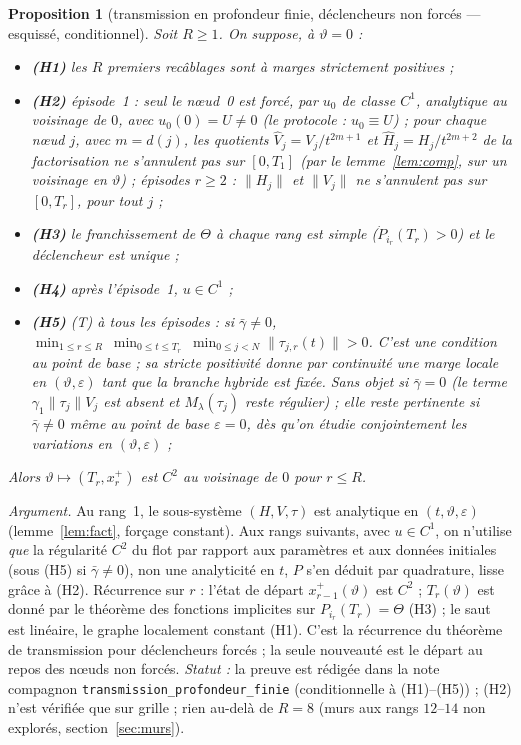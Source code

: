 \documentclass[11pt,a4paper]{article}
\newtheorem{proposition}{Proposition}
\theoremstyle{remark}
\newcommand{\vth}{\vartheta}
\begin{document}
\begin{proposition}[transmission en profondeur finie, d\'eclencheurs non forc\'es --- esquiss\'e, conditionnel]\label{prop:fini}
Soit $R\ge1$. On suppose, \`a $\vth=0$ :
\begin{itemize}[leftmargin=1.6em,itemsep=1pt]
\item \textbf{(H1)} les $R$ premiers recâblages sont \`a marges strictement positives ;
\item \textbf{(H2)} \emph{\'episode~1} : seul le n\oe ud~0 est forc\'e, par $u_0$ de classe $C^1$, analytique au voisinage de $0$, avec $u_0(0)=U\neq0$ (le protocole : $u_0\equiv U$) ; \emph{pour chaque n\oe ud $j$}, avec $m=d(j)$, les quotients $\hat V_j=V_j/t^{2m+1}$ et $\hat H_j=H_j/t^{2m+2}$ de la factorisation ne s'annulent pas sur $[0,T_1]$ (par le lemme~\ref{lem:comp}, sur un voisinage en $\vth$) ; \emph{\'episodes $r\ge2$} : $\lVert H_j\rVert$ et $\lVert V_j\rVert$ ne s'annulent pas sur $[0,T_r]$, pour tout $j$ ;
\item \textbf{(H3)} le franchissement de $\Theta$ \`a chaque rang est simple ($\dot P_{i_r}(T_r)>0$) et le d\'eclencheur est unique ;
\item \textbf{(H4)} apr\`es l'\'episode~1, $u\in C^1$ ;
\item \textbf{(H5)} (T) \`a \emph{tous} les \'episodes : si $\bar\gamma\neq0$, $\displaystyle\min_{1\le r\le R}\ \min_{0\le t\le T_r}\ \min_{0\le j<N}\lVert\tau_{j,r}(t)\rVert>0$. C'est une condition au point de base ; sa stricte positivit\'e donne par continuit\'e une marge locale en $(\vth,\varepsilon)$ tant que la branche hybride est fix\'ee. Sans objet si $\bar\gamma=0$ (le terme $\gamma_1\lVert\tau_j\rVert V_j$ est absent et $M_\lambda(\tau_j)$ reste r\'egulier) ; elle reste pertinente si $\bar\gamma\neq0$ m\^eme au point de base $\varepsilon=0$, d\`es qu'on \'etudie conjointement les variations en $(\vth,\varepsilon)$ ;
\end{itemize}
Alors $\vth\mapsto(T_r,x_r^+)$ est $C^2$ au voisinage de $0$ pour $r\le R$.
\end{proposition}
\noindent\emph{Argument.} Au rang~1, le sous-syst\`eme $(H,V,\tau)$ est analytique en $(t,\vth,\varepsilon)$ (lemme~\ref{lem:fact}, for\c{c}age constant). Aux rangs suivants, avec $u\in C^1$, on n'utilise \emph{que} la r\'egularit\'e $C^2$ du flot par rapport aux param\`etres et aux donn\'ees initiales (sous (H5) si $\bar\gamma\neq0$), non une analyticit\'e en $t$, $P$ s'en d\'eduit par quadrature, lisse gr\^ace \`a (H2). R\'ecurrence sur $r$ : l'\'etat de d\'epart $x_{r-1}^+(\vth)$ est $C^2$ ; $T_r(\vth)$ est donn\'e par le th\'eor\`eme des fonctions implicites sur $P_{i_r}(T_r)=\Theta$ (H3) ; le saut est lin\'eaire, le graphe localement constant (H1). C'est la r\'ecurrence du th\'eor\`eme de transmission pour d\'eclencheurs forc\'es ; la seule nouveaut\'e est le d\'epart au repos des n\oe uds non forc\'es. \emph{Statut :} la preuve est r\'edig\'ee dans la note compagnon \texttt{transmission\_profondeur\_finie} (conditionnelle \`a (H1)--(H5)) ; (H2) n'est v\'erifi\'ee que sur grille ; rien au-del\`a de $R=8$ (murs aux rangs $12$--$14$ non explor\'es, section~\ref{sec:murs}).
\end{document}
